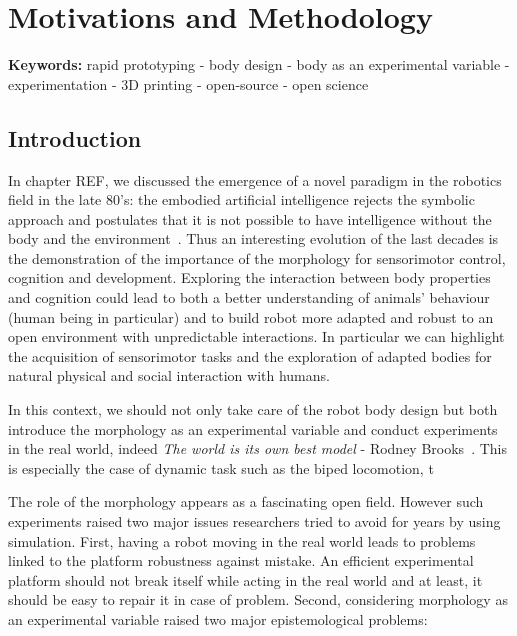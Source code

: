 

\chapter{Motivations and Methodology}

\textbf{Keywords:} rapid prototyping - body design - body as an experimental variable - experimentation - 3D printing - open-source - open science


\section{Introduction} %

In chapter REF, we discussed the emergence of a novel paradigm in the robotics field in the late 80's: the embodied artificial intelligence rejects the symbolic approach and postulates that it is not possible to have intelligence without the body and the environment~\cite{pfeifer2001understanding}.
Thus an interesting evolution of the last decades is the demonstration of the importance of the morphology for sensorimotor control, cognition and development.
Exploring the interaction between body properties and cognition could lead to both a better understanding of animals’ behaviour (human being in particular) and to build robot more adapted and robust to an open environment with unpredictable interactions. In particular we can highlight the acquisition of sensorimotor tasks and the exploration of adapted bodies for natural physical and social interaction with humans.

In this context, we should not only take care of the robot body design but both introduce the morphology as an experimental variable and conduct experiments in the real world, indeed \emph{The world is its own best model} - Rodney Brooks~\cite{brooks1991intelligence}. This is especially the case of dynamic task such as the biped locomotion, t

The role of the morphology appears as a fascinating open field.
However such experiments raised two major issues researchers tried to avoid for years by using simulation. First, having a robot moving in the real world leads to problems linked to the platform robustness against mistake. An efficient experimental platform should not break itself while acting in the real world and at least, it should be easy to repair it in case of problem. Second, considering morphology as an experimental variable raised two major epistemological problems:




